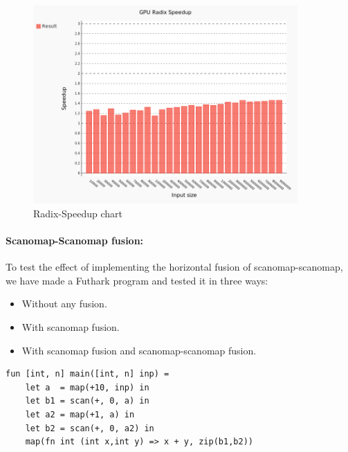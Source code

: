 \documentclass[11pt,bibliography=totocnumbered]{article}
\begin{document}
\begin{figure}[hb]
  \centering
    \includegraphics[width=0.9\textwidth]{images/radix-comparing.png}
  \caption{Radix-Speedup chart}
  \label{fig:scanomap-radix}
\end{figure}

\paragraph*{Scanomap-Scanomap fusion:}
To test the effect of implementing the horizontal fusion of scanomap-scanomap, we have made a Futhark program and tested it in three ways:

\begin{itemize}
\item Without any fusion.
\item With scanomap fusion.
\item With scanomap fusion and scanomap-scanomap fusion.
\end{itemize}

\begin{lstlisting}[caption=Scanomap-scanomap benchmark program] 
fun [int, n] main([int, n] inp) =
    let a  = map(+10, inp) in
    let b1 = scan(+, 0, a) in
    let a2 = map(+1, a) in
    let b2 = scan(+, 0, a2) in
    map(fn int (int x,int y) => x + y, zip(b1,b2))

\end{lstlisting}
\end{document}
